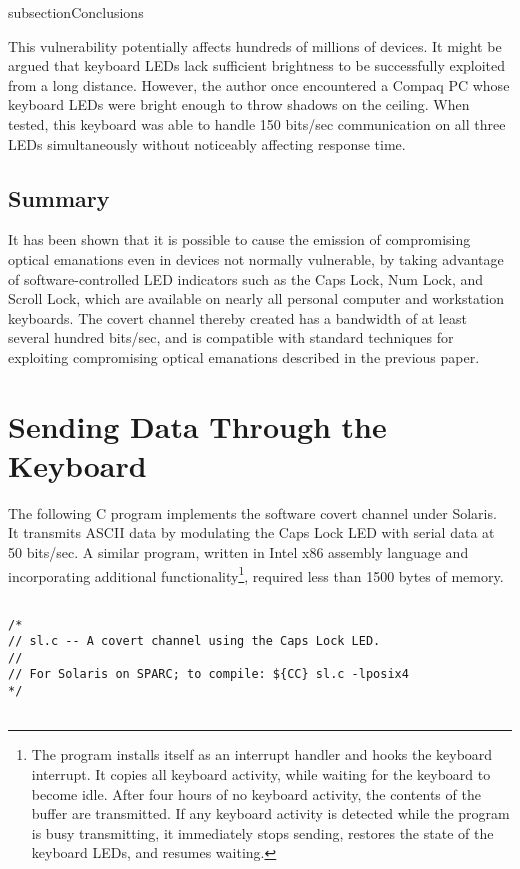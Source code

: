 \documentclass[twocolumn]{article}
\begin{document}
{subsection{Conclusions}

This vulnerability potentially affects hundreds of millions of devices.
It might be argued that keyboard LEDs lack sufficient brightness to be successfully exploited from a long distance.  However, the author once encountered a Compaq PC whose keyboard LEDs were bright enough to throw shadows on the ceiling.  When tested, this keyboard was able to handle 150 bits/sec communication on all three LEDs simultaneously without noticeably affecting response time.

\subsection{Summary}

It has been shown that it is possible to cause the emission of compromising optical emanations even in devices not normally vulnerable, by taking advantage of software-controlled LED indicators such as the Caps Lock, Num Lock, and Scroll Lock, which are available on nearly all personal computer and workstation keyboards.  The covert channel thereby created has a bandwidth of at least several hundred bits/sec, and is compatible with standard techniques for exploiting compromising optical emanations described in the previous paper.

\section{Sending Data Through the Keyboard}

The following C program implements the software covert channel under Solaris.  It transmits ASCII data by modulating the Caps Lock LED with serial data at 50 bits/sec.  A similar program, written in Intel x86 assembly language and incorporating additional functionality\footnote{The program installs itself as an interrupt handler and hooks the keyboard interrupt.  It copies all keyboard activity, while waiting for the keyboard to become idle.  After four hours of no keyboard activity, the contents of the buffer are transmitted.  If any keyboard activity is detected while the program is busy transmitting, it immediately stops sending, restores the state of the keyboard LEDs, and resumes waiting.}, required less than 1500 bytes of memory.

\begin{verbatim}

/*
// sl.c -- A covert channel using the Caps Lock LED.
//
// For Solaris on SPARC; to compile: ${CC} sl.c -lposix4
*/


\end{verbatim}}
\end{document}
